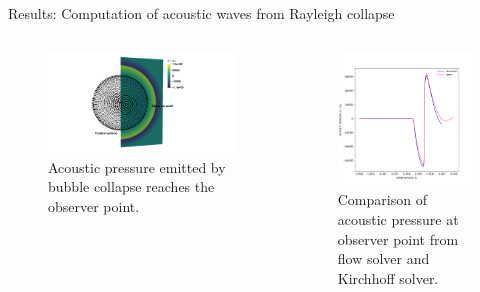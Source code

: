 \documentclass[10pt, aspectratio=169]{beamer}
\begin{document}
\begin{frame}{Results: Computation of acoustic waves from Rayleigh collapse}
	\begin{columns}
		\begin{column}{.56\textwidth}
			\begin{figure}
				\centering
				\includegraphics[scale=0.2]{images/acoustic_pressure.png}
				\caption*{Acoustic pressure emitted by bubble collapse reaches the observer point.}
			\end{figure}
		\end{column}
		\begin{column}{0.4\textwidth}
			\begin{figure}
				\centering
				\includegraphics[scale=0.25]{images/structured_pressure.png}
				\caption*{Comparison of acoustic pressure at observer point from flow solver and Kirchhoff solver.}
			\end{figure}
		\end{column}
	\end{columns}	
\end{frame}
\end{document}
